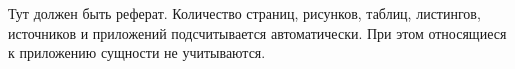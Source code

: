\begin{essaywithapp}

	Тут должен быть реферат. Количество страниц, рисунков, таблиц, листингов,
	источников и приложений подсчитывается автоматически. При этом относящиеся к
	приложению сущности не учитываются.

\end{essaywithapp}